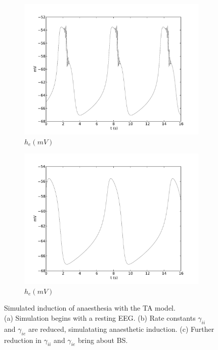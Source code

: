 \documentclass[a4paper,12pt]{article}
\begin{document}
\begin{figure}
\begin{subfigure}[b]{0.5\textwidth}
		\includegraphics[scale=0.35]{frontiers-2012-images-revised/effect_gamma_ee_yml-00143_ode-burst-thal-rev_yml-thal-rev-mod-1-1_1-1-save_yml-he-thal.pdf}
		\caption{$h_e (mV)$}
	\end{subfigure}
	\begin{subfigure}[b]{0.5\textwidth}
		\includegraphics[scale=0.35]{frontiers-2012-images-revised/effect_gamma_ee_yml-00143_ode-burst-thal-rev_yml-thal-rev-mod-1-1_3-1-save_yml-he-thal.pdf}
		\caption{$h_e (mV)$}
	\end{subfigure}
	\label{fig:00143}
	\caption{Simulated induction of anaesthesia with the TA model. \\
(a) Simulation begins with a resting EEG. 
(b) Rate constants $\gamma_{ii}$ and $\gamma_{ie}$ are reduced, simulatating anaesthetic induction. (c) Further reduction in $\gamma_{ii}$ and $\gamma_{ie}$ bring about BS.
}
\end{figure}
\end{document}
